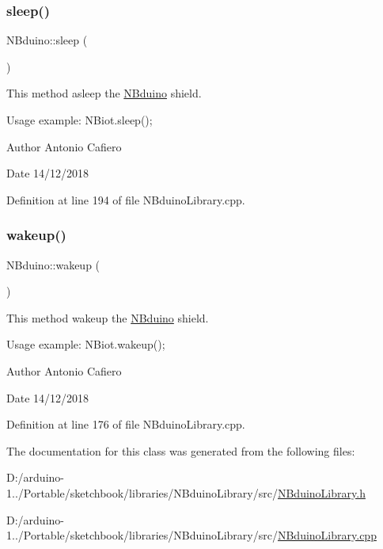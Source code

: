 \subsubsection{\texorpdfstring{sleep()}{sleep()}}
{\footnotesize\ttfamily N\+Bduino\+::sleep (\begin{DoxyParamCaption}{ }\end{DoxyParamCaption})}

This method asleep the \mbox{\hyperlink{class_n_bduino}{N\+Bduino}} shield. 
\begin{DoxyCode}
Usage example:
    NBiot.sleep();
\end{DoxyCode}
 \begin{DoxyAuthor}{Author}
Antonio Cafiero 
\end{DoxyAuthor}
\begin{DoxyDate}{Date}
14/12/2018 
\end{DoxyDate}


Definition at line 194 of file N\+Bduino\+Library.\+cpp.

\mbox{\label{class_n_bduino_a8e740e7b90e6e75b7dd3b7900ee0dd22}} 
\subsubsection{\texorpdfstring{wakeup()}{wakeup()}}
{\footnotesize\ttfamily N\+Bduino\+::wakeup (\begin{DoxyParamCaption}{ }\end{DoxyParamCaption})}

This method wakeup the \mbox{\hyperlink{class_n_bduino}{N\+Bduino}} shield. 
\begin{DoxyCode}
Usage example:
    NBiot.wakeup();
\end{DoxyCode}
 \begin{DoxyAuthor}{Author}
Antonio Cafiero 
\end{DoxyAuthor}
\begin{DoxyDate}{Date}
14/12/2018 
\end{DoxyDate}


Definition at line 176 of file N\+Bduino\+Library.\+cpp.



The documentation for this class was generated from the following files\+:\begin{DoxyCompactItemize}
\item 
D\+:/arduino-\/1../\+Portable/sketchbook/libraries/\+N\+Bduino\+Library/src/\mbox{\hyperlink{_n_bduino_library_8h}{N\+Bduino\+Library.\+h}}\item 
D\+:/arduino-\/1../\+Portable/sketchbook/libraries/\+N\+Bduino\+Library/src/\mbox{\hyperlink{_n_bduino_library_8cpp}{N\+Bduino\+Library.\+cpp}}\end{DoxyCompactItemize}
